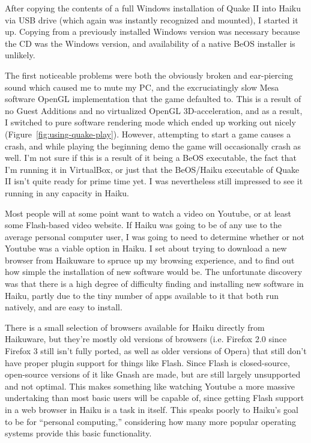 \documentclass{article}
\newcommand{\figref}[1]{Figure~\ref{fig:#1}}
\begin{document}
After copying the contents of a full Windows installation of Quake II
into Haiku via USB drive (which again was instantly recognized and
mounted), I started it up. Copying from a previously installed Windows
version was necessary because the CD was the Windows version, and availability
of a native BeOS installer is unlikely. 

The first noticeable problems were both
the obviously broken and ear-piercing sound which caused me to mute my
PC, and the excruciatingly slow Mesa software OpenGL implementation
that the game defaulted to.  This is a result of no Guest Additions
and no virtualized OpenGL 3D-acceleration, and as a result, I switched
to pure software rendering mode which ended up working out nicely
(\figref{using-quake-play}).  However, attempting to start a game
causes a crash, and while playing the beginning demo the game will
occasionally crash as well.  I'm not sure if this is a result of it
being a BeOS executable, the fact that I'm running it in VirtualBox,
or just that the BeOS/Haiku executable of Quake II isn't quite ready
for prime time yet.  I was nevertheless still impressed to see it
running in any capacity in Haiku.
	
Most people will at some point want to watch a video on Youtube, or at
least some Flash-based video website.  If Haiku was going to be of any
use to the average personal computer user, I was going to need to
determine whether or not Youtube was a viable option in Haiku.  I set
about trying to download a new browser from Haikuware to spruce up my
browsing experience, and to find out how simple the installation of new
software would be. The unfortunate discovery was that there is a high
degree of difficulty finding and installing new software in Haiku, partly
due to the tiny number of apps available to it that both run natively,
and are easy to install.

There is a small selection of browsers available for Haiku directly
from Haikuware, but they're mostly old versions of browsers
(i.e. Firefox 2.0 since Firefox 3 still isn't fully ported, as well as
older versions of Opera) that still don't have proper plugin support
for things like Flash.  Since Flash is closed-source, open-source
versions of it like Gnash are made, but are still largely unsupported
and not optimal.  This makes something like watching Youtube a more
massive undertaking than most basic users will be capable of, since
getting Flash support in a web browser in Haiku is a task in itself.
This speaks poorly to Haiku's goal to be for ``personal computing,''
considering how many more popular operating systems provide this basic
functionality.
\end{document}
